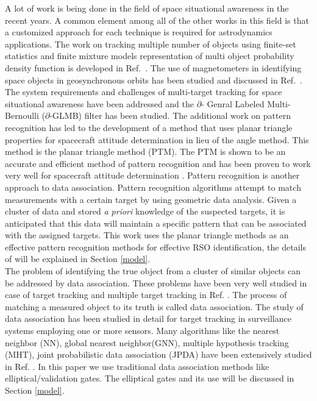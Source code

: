 \documentclass[]{aiaa-tc}%
\begin{document}
A lot of work is being done in the field of space situational awareness in the recent years. A common element among all of the other works in this field is that a customized approach for
each technique is required for astrodynamics applications. The work on tracking multiple number of objects using finite-set statistics and finite mixture models representation of multi object probability density function is developed in Ref.~. The use of magnetometers in identifying space objects in geosynchronous orbits has been studied and discussed in Ref.~. The system requirements and challenges of multi-target tracking for space situational awareness have been addressed and the $\partial$- Genral Labeled Multi-Bernoulli ($\partial$-GLMB) filter has been studied. The additional work on pattern recognition has led to the development of a method that uses planar triangle properties for spacecraft attitude determination in lieu of the angle method.  This method is the planar triangle method (PTM). The PTM is shown to be an accurate and efficient method of pattern recognition and has been proven to work very well for spacecraft attitude determination \cite{cole_fast_2006}. Pattern recognition is another approach to data association. Pattern recognition algorithms attempt to match measurements with a certain target by using geometric data analysis. Given a cluster of data and stored \textit{a priori} knowledge of the suspected targets, it is anticipated that this data will maintain a specific pattern that can be associated with the assigned targets. This work uses the planar triangle methods as an effective pattern recognition methods for effective RSO identification, the details of will be explained in Section \ref{model}.\\ 

The problem of identifying the true object from a cluster of similar objects can be addressed by data association. These problems have been very well studied in case of target tracking and multiple target tracking in  Ref. . The process of matching a measured object to its truth is called data association. The study of data association has been studied in detail for target tracking in surveillance systems employing one or more sensors. Many algorithms like the nearest neighbor (NN), global nearest neighbor(GNN), multiple hypothesis tracking (MHT), joint probabilistic data association (JPDA) have been extensively studied in Ref. . In this paper we use traditional data association methods like elliptical/validation gates. The elliptical gates and its use will be discussed in Section \ref{model}.
\end{document}
